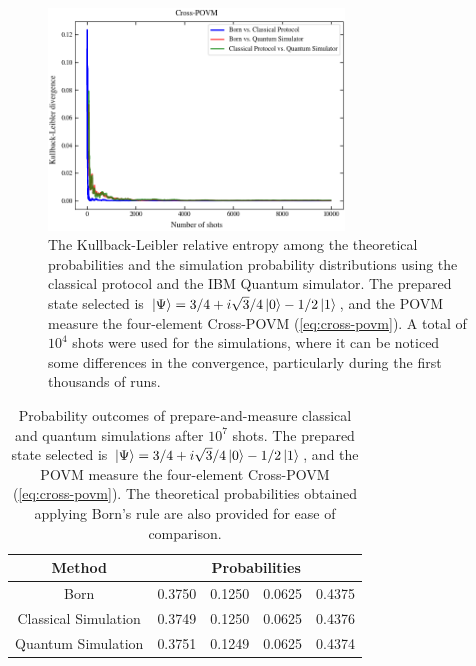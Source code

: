 \begin{figure}[h!]
\centering
\includegraphics[width=0.7\textwidth]{images/pm_povm_kl_bcq.png}
\caption{The Kullback-Leibler relative entropy among the theoretical probabilities and the simulation probability distributions using the classical protocol and the IBM Quantum simulator. The prepared state selected is $\ket{\Psi}=3/4 + i \sqrt{3}/4 \ket{0} - 1/2 \ket{1}$, and the POVM measure the four-element Cross-POVM (\ref{eq:cross-povm}). A total of $10^4$ shots were used for the simulations, where it can be noticed some differences in the convergence, particularly during the first thousands of runs.}
\label{fig:classical_quantum_results_kl}
\end{figure}

\begin{table}[h!]
\centering
\begin{tabular}{c c c c c} 
 \toprule
 Method & \multicolumn{4}{c}{Probabilities}  \\ \hline
 Born & 0.3750 & 0.1250 & 0.0625 & 0.4375 \\ 
 Classical Simulation & 0.3749 & 0.1250 & 0.0625 & 0.4376 \\ 
 Quantum Simulation & 0.3751 & 0.1249 & 0.0625 & 0.4374 \\ 
 \bottomrule
\end{tabular}
\caption{Probability outcomes of prepare-and-measure classical and quantum simulations after $10^{7}$ shots. The prepared state selected is $\ket{\Psi}=3/4 + i \sqrt{3}/4 \ket{0} - 1/2 \ket{1}$, and the POVM measure the four-element Cross-POVM (\ref{eq:cross-povm}). The theoretical probabilities obtained applying Born’s rule are also
provided for ease of comparison.}
\label{table:classical_quantum_results}
\end{table}

